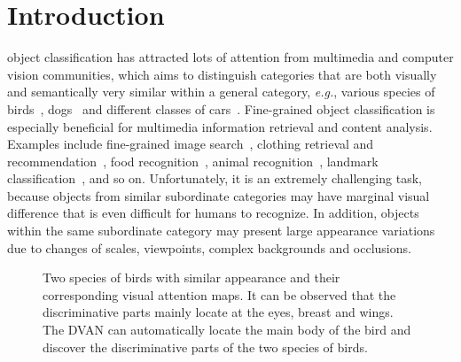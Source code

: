 \documentclass[journal]{IEEEtran}
\begin{document}
\section{Introduction}
\label{sec:introduction}
 object classification has attracted lots of attention from multimedia and computer vision communities, which aims to distinguish categories that are both visually and semantically very similar within a general category,\textit{ e.g.}, various species of birds~\cite{CUB_200_2011}, dogs~\cite{standford_dogs,Liu2012} and different classes of cars~\cite{standford_cars,Yang:2015ul}.
Fine-grained object classification is especially beneficial for multimedia information retrieval and content analysis. Examples include fine-grained image search~\cite{tmm04}, clothing retrieval and recommendation~\cite{r03,r06,r08}, food recognition~\cite{r09}, animal recognition~\cite{Liu2012,attention_categorization}, landmark classification~\cite{tmm07,wei2015hcp}, and so on.
Unfortunately, it is an extremely challenging task, because objects from similar subordinate categories may have marginal visual difference that is even difficult for humans to recognize. In addition, objects within the same subordinate category may present large appearance variations due to changes of scales, viewpoints, complex backgrounds and occlusions.

\begin{figure}[!t]
  \centering
  \vspace{-0.1in}
  \hfil
\caption{Two species of birds with similar appearance and their corresponding visual attention maps. It can be observed that the discriminative parts mainly locate at the eyes, breast and wings. The DVAN can automatically locate the main body of the bird and discover the discriminative parts of the two species of birds.
  }
  \label{fig:diversified_attention}
  \vspace{-0.2in}
\end{figure}
\end{document}

